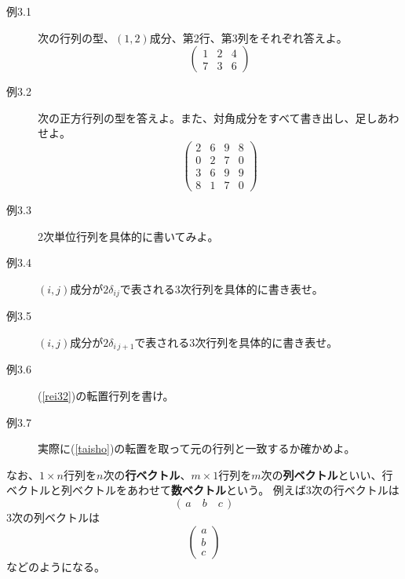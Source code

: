 \documentclass[10pt]{jsarticle}
\theoremstyle{definition}%
\newcommand{\kakko}[1]{\left(#1 \right)} %
\numberwithin{equation}{section}%
\begin{document}
\begin{description}
  \item[例3.1] 次の行列の型、$(1,2)$成分、第2行、第3列をそれぞれ答えよ。
  \begin{equation}
    \left( 
      \begin{matrix}
        1 & 2 & 4 \\
        7 & 3 & 6
      \end{matrix}
    \right)
  \end{equation}
  \item[例3.2] 次の正方行列の型を答えよ。また、対角成分をすべて書き出し、足しあわせよ。
  \begin{equation}
  \label{rei32}  \left( 
      \begin{matrix}
        2 & 6 & 9 & 8\\
        0 & 2 & 7 & 0 \\
        3 & 6 & 9 & 9 \\
        8 & 1 & 7 & 0
      \end{matrix}
    \right)
  \end{equation}
  \item[例3.3] 2次単位行列を具体的に書いてみよ。
  \item[例3.4] $(i,j)$成分が$2\delta_{ij}$で表される3次行列を具体的に書き表せ。 
  \item[例3.5] $(i,j)$成分が$2\delta_{i\, j+1}$で表される3次行列を具体的に書き表せ。 
  \item[例3.6] (\ref{rei32})の転置行列を書け。
  \item[例3.7] 実際に(\ref{taisho})の転置を取って元の行列と一致するか確かめよ。
\end{description}
なお、$1\times n$行列を$n$次の{\bf 行ベクトル}、$m\times 1$行列を$m$次の{\bf 列ベクトル}といい、行ベクトルと列ベクトルをあわせて{\bf 数ベクトル}という。
例えば3次の行ベクトルは
\begin{equation}
  (\, a \quad b \quad c \,)
\end{equation}
3次の列ベクトルは
\begin{equation}
  \kakko{
    \begin{matrix}
      a\\
      b\\
      c
    \end{matrix}
  }
\end{equation}
などのようになる。


\end{document}
